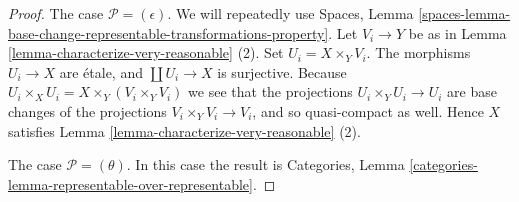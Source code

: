 \documentclass{stacks-project}
\theoremstyle{plain}
\theoremstyle{definition}
\theoremstyle{remark}
\numberwithin{equation}{subsection}
\begin{document}
\begin{proof}
\medskip\noindent
The case $\mathcal{P} = (\epsilon)$. We will repeatedly use
Spaces, Lemma
\ref{spaces-lemma-base-change-representable-transformations-property}.
Let $V_i \to Y$ be as in
Lemma \ref{lemma-characterize-very-reasonable} (2).
Set $U_i = X \times_Y V_i$. The morphisms $U_i \to X$ are \'etale,
and $\coprod U_i \to X$ is surjective. Because
$U_i \times_X U_i = X \times_Y (V_i \times_Y V_i)$ we see
that the projections $U_i \times_Y U_i \to U_i$ are
base changes of the projections $V_i \times_Y V_i \to V_i$, and so
quasi-compact as well. Hence $X$ satisfies
Lemma \ref{lemma-characterize-very-reasonable} (2).

\medskip\noindent
The case $\mathcal{P} = (\theta)$. In this case the result is
Categories, Lemma \ref{categories-lemma-representable-over-representable}.
\end{proof}
\end{document}
